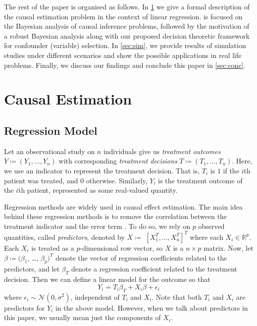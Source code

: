 \documentclass[preprint,12pt]{elsarticle}
\begin{document}
The rest of the paper is organised as follows. In \cref{sec:causal}
we give a formal description of the causal estimation problem in the
context of linear regression.  is focused on the
Bayesian analysis of causal inference problems, followed by the
motivation of a robust Bayesian analysis along with our proposed decision 
theoretic framework for confounder (variable) selection. In \cref{sec:sim}, 
we provide results of simulation studies under different scenarios 
and show the possible applications in real life problems. Finally, 
we discuss our findings and conclude this paper in \cref{sec:conc}.

\section{Causal Estimation}\label{sec:causal}

\subsection{Regression Model}

Let an observational study on $n$ individuals give us
\emph{treatment outcomes} $Y\coloneqq(Y_1, \dots, Y_n)$ with 
corresponding \emph{treatment decisions} $T\coloneqq(T_1, \dots, T_n)$.
Here, we use an indicator to represent the treatment decision. That is, $T_i$ is $1$ if the $i$th patient was treated, and $0$ otherwise. Similarly,
$Y_i$ is the treatment outcome of the $i$th patient, represented as some real-valued quantity.

Regression methods are widely used in causal effect estimation. The
main idea behind these regression methods is to remove the
correlation between the treatment indicator and the error term
\citep{winship99,HECKMAN1985}.
To do so, we rely on $p$ observed quantities, called
\emph{predictors}, denoted by $X\coloneqq$ $[X_1^T, \dots, X_n^T]^T$
where each $X_i\in\mathbb{R}^p$.
Each $X_i$ is treated as a $p$-dimensional row vector,
so $X$ is a $n\times p$ matrix.
Now, let
$\beta \coloneqq (\beta_1$, \dots, $\beta_p)^T$ denote the vector of regression
coefficients
related to the predictors, and let $\beta_T$ denote a regression coefficient related to the
treatment decision.
Then we can define a linear model for the outcome
so that
\begin{equation}
	Y_i =  T_i \beta_{T} + X_i\beta + \epsilon_i
\end{equation}
where $\epsilon_i\sim \mathcal{N}(0, \sigma^2)$,
independent of $T_i$ and $X_i$.
Note that both $T_i$ and $X_i$ are predictors for $Y_i$ in the above model.
However, when we talk about predictors in this paper, we usually mean just the components of $X_i$.
\end{document}
